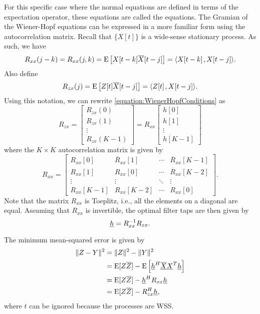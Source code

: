 For this specific case where the normal equations are defined in terms of the expectation operator, these equations are called the  equations.
The Gramian of the Wiener-Hopf equations can be expressed in a more familiar form using the autocorrelation matrix.
Recall that $\{ X[t] \}$ is a wide-sense stationary process.
As such, we have
\begin{equation*}
R_{xx} (j-k) = R_{xx} (j, k) = \mathrm{E} \left[ X[t-k] \overline{X}[t-j] \right]
= {\left\langle  X[t-k]  \mskip2mu ,  X[t-j]  \right\rangle} .
\end{equation*}
Also define
\begin{equation*}
R_{zx}(j) = \mathrm{E} \left[ Z[t] \overline{X}[t-j] \right]
= {\left\langle  Z[t]  \mskip2mu ,  X[t-j]  \right\rangle} .
\end{equation*}
Using this notation, we can rewrite \eqref{equation:WienerHopfConditions} as
\begin{equation*}
R_{zx} = \begin{bmatrix}
R_{zx} (0) \\ R_{zx} (1) \\ \vdots \\ R_{zx} (K-1) \end{bmatrix}
= R_{xx}
\begin{bmatrix}
h [0] \\
h [1] \\ \vdots \\
h [K-1] \end{bmatrix}
\end{equation*}
where the $K \times K$ autocorrelation matrix is given by
\begin{equation*}
R_{xx} = \begin{bmatrix}
R_{xx} [0] & \overline{R}_{xx}[1] & \cdots & \overline{R}_{xx}[K-1] \\
R_{xx} [1] & R_{xx}[0] & \cdots & \overline{R}_{xx}[K-2] \\
\vdots & \vdots & \ddots & \vdots \\
R_{xx} [K-1] & R_{xx}[K-2] & \cdots & R_{xx}[0]
\end{bmatrix} .
\end{equation*}
Note that the matrix $R_{xx}$ is Toeplitz, i.e., all the elements on a diagonal are equal.
Assuming that $R_{xx}$ is invertible, the optimal filter taps are then given by
\begin{equation*}
\underline{h} = R_{xx}^{-1} R_{zx}.
\end{equation*}

The minimum mean-squared error is given by
\begin{equation*}
\begin{split}
\| Z-Y \|^2 &= \| Z \|^2 - \| Y \|^2 \\
&= \mathrm{E} [Z \overline{Z}] - \mathrm{E} \left[ \underline{h}^H \overline{\underline{X}} \underline{X}^T \underline{h} \right] \\
&= \mathrm{E} [Z \overline{Z}] - \underline{h}^H R_{xx} \underline{h} \\
&= \mathrm{E} [Z \overline{Z}] - R_{zx}^H \underline{h} ,
\end{split}
\end{equation*}
where $t$ can be ignored because the processes are WSS.


